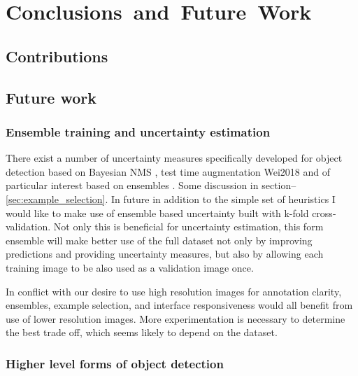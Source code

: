 \chapter{Conclusions~and~Future~Work}
\label{chap:future} 


\section{Contributions}





\section{Future work}

\subsection{Ensemble training and uncertainty estimation}

There exist a number of uncertainty measures specifically developed for object detection based on Bayesian \gls{NMS} \cite{Harakeh}, test time augmentation {Wei2018} and of particular interest based on ensembles \cite{Le2018}. Some discussion in section--\ref{sec:example_selection}. In future in addition to the simple set of heuristics I would like to make use of ensemble based uncertainty built with k-fold cross-validation. Not only this is beneficial for uncertainty estimation, this form ensemble will make better use of the full dataset not only by improving predictions and providing uncertainty measures, but also by allowing each training image to be also used as a validation image once.

In conflict with our desire to use high resolution images for annotation clarity, ensembles, example selection, and interface responsiveness would all benefit from use of lower resolution images. More experimentation is necessary to determine the best trade off, which seems likely to depend on the dataset.



\subsection{Higher level forms of object detection}

